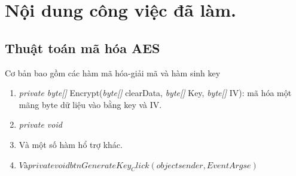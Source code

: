 \documentclass[paper=a4, fontsize=11pt]{scrartcl}	%
\numberwithin{equation}{section}															%
\numberwithin{figure}{section}																%
\numberwithin{table}{section}																%
\begin{document}
		
		
\section{Nội dung công việc đã làm.}
 

\subsection{Thuật toán mã hóa AES}
	Cơ bản bao gồm các hàm mã hóa-giải mã và hàm sinh key
	
	\begin{enumerate}
	\item \emph{private byte[]} Encrypt(\emph{byte[]} clearData, \emph{byte[]} Key, \emph{byte[]} IV): mã hóa một mãng byte dữ liệu vào bằng key và IV.

    \item \emph{private void}  
    
  
\item Và một số hàm hổ trợ khác.

\item $Và private void btnGenerateKey_Click ( object sender, EventArgs e )$

	\end{enumerate}
\end{document}
